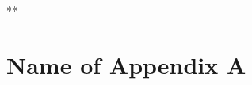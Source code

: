 \documentclass[a4paper,14pt]{extarticle} %
\begin{document}
	
	
	
	
	
	
	
	
**\appendix
\section{Name of Appendix A}
\label{app:BillRes}
\end{document}
